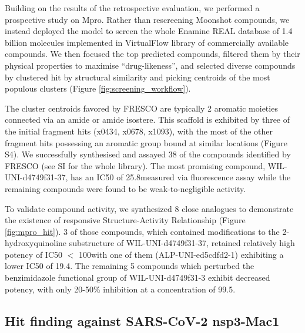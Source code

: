Building on the results of the retrospective evaluation, we performed a prospective study on Mpro. Rather than rescreening Moonshot compounds, we instead deployed the model to screen the whole Enamine REAL database of 1.4 billion molecules implemented in VirtualFlow \cite{Gorgulla2020VirtualFlow} library of commercially available compounds. We then focused the top predicted compounds, filtered them by their physical properties to maximise ``drug-likeness'', and selected diverse compounds by clustered hit by structural similarity and picking centroids of the most populous clusters (Figure \ref{fig:screening_workflow}).

The cluster centroids favored by FRESCO are typically 2 aromatic moieties connected via an amide or amide isostere. This scaffold is exhibited by three of the initial fragment hits (x0434, x0678, x1093), with the most of the other fragment hits possessing an aromatic group bound at similar locations (Figure S4). We successfully synthesised and assayed 38 of the compounds identified by FRESCO (see SI for the whole library). The most promising compound, WIL-UNI-d4749f31-37, has an IC50 of 25.8\uM measured via fluorescence assay while the remaining compounds were found to be weak-to-negligible activity.

To validate compound activity, we synthesized 8 close analogues to demonstrate the existence of responsive Structure-Activity Relationship  \cite{Hermann2013ZincImpurity, Morreale2017ZincImpurity} (Figure \ref{fig:mpro_hit}). 3 of those compounds, which contained modifications to the 2-hydroxyquinoline substructure of WIL-UNI-d4749f31-37, retained relatively high potency of IC50 $<$ 100\uM with one of them (ALP-UNI-ed5cdfd2-1) exhibiting a lower IC50 of 19.4\uM. The remaining 5 compounds which perturbed the benzimidazole functional group of WIL-UNI-d4749f31-3 exhibit decreased potency, with only 20-50\% inhibition at a concentration of 99.5\uM.

\subsection{Hit finding against SARS-CoV-2 nsp3-Mac1} \label{subsubsec:mac1}

